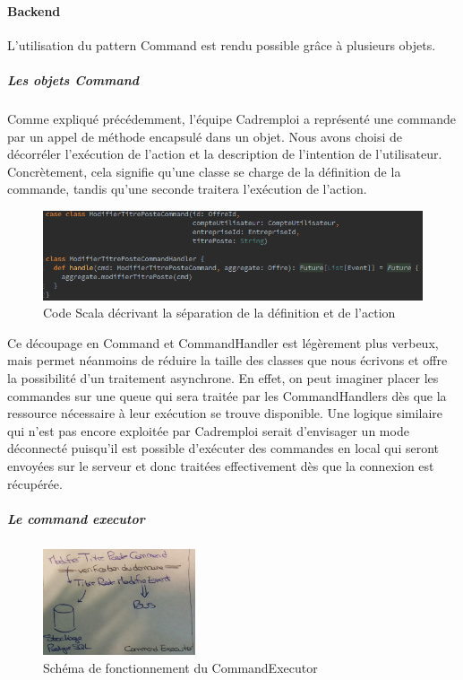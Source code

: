 \paragraph{Backend}
\label{par:Backend}
L'utilisation du pattern Command est rendu possible grâce à plusieurs objets.
\subparagraph{Les objets Command}
\label{subp:Les objets Command}
Comme expliqué précédemment, l'équipe Cadremploi a représenté une commande par un appel de méthode encapsulé dans un objet.
Nous avons choisi de décorréler l'exécution de l'action et la description de l'intention de l'utilisateur.
Concrètement, cela signifie qu'une classe se charge de la définition de la commande, tandis qu'une seconde traitera l'exécution de l'action.
\begin{figure}[h]
  \begin{center}
    \includegraphics[width=1\textwidth]{Pictures/EventSourcing/separation_command_et_handler.png}
    \caption{Code Scala décrivant la séparation de la définition et de l'action}
  \end{center}
\end{figure}
Ce découpage en Command et CommandHandler est légèrement plus verbeux, mais permet néanmoins de réduire la taille des classes que nous écrivons et offre la possibilité d'un traitement asynchrone.
En effet, on peut imaginer placer les commandes sur une queue qui sera traitée par les CommandHandlers dès que la ressource nécessaire à leur exécution se trouve disponible.
Une logique similaire qui n'est pas encore exploitée par Cadremploi serait d'envisager un mode déconnecté puisqu'il est possible d'exécuter des commandes en local qui seront envoyées sur le serveur et donc traitées effectivement dès que la connexion est récupérée.
\subparagraph{Le command executor}
\label{subp:Le command executor}
\begin{figure}[h]
  \begin{center}
    \includegraphics[width=0.4\textwidth]{Pictures/EventSourcing/command_executor.png}
    \caption{Schéma de fonctionnement du CommandExecutor}
  \end{center}
\end{figure}
